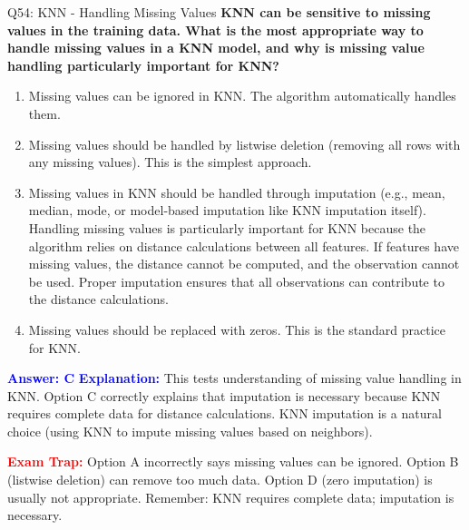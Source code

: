 \documentclass[8pt]{beamer}
\begin{document}
	\begin{frame}{Q54: KNN - Handling Missing Values}
		\fontsize{6.5}{7.5}\selectfont
		\textbf{KNN can be sensitive to missing values in the training data. What is the most appropriate way to handle missing values in a KNN model, and why is missing value handling particularly important for KNN?}
		
		\begin{enumerate}
			\item Missing values can be ignored in KNN. The algorithm automatically handles them.
			\item Missing values should be handled by listwise deletion (removing all rows with any missing values). This is the simplest approach.
			\item Missing values in KNN should be handled through imputation (e.g., mean, median, mode, or model-based imputation like KNN imputation itself). Handling missing values is particularly important for KNN because the algorithm relies on distance calculations between all features. If features have missing values, the distance cannot be computed, and the observation cannot be used. Proper imputation ensures that all observations can contribute to the distance calculations.
			\item Missing values should be replaced with zeros. This is the standard practice for KNN.
		\end{enumerate}
		
		\vspace{0.1cm}
		\textcolor{blue}{\textbf{Answer: C}}
		\vspace{0.1cm}
		\textcolor{blue}{\textbf{Explanation:}} This tests understanding of missing value handling in KNN. Option C correctly explains that imputation is necessary because KNN requires complete data for distance calculations. KNN imputation is a natural choice (using KNN to impute missing values based on neighbors).
		
		\textcolor{red}{\textbf{Exam Trap:}} Option A incorrectly says missing values can be ignored. Option B (listwise deletion) can remove too much data. Option D (zero imputation) is usually not appropriate. Remember: KNN requires complete data; imputation is necessary.
	\end{frame}
	
\end{document}
